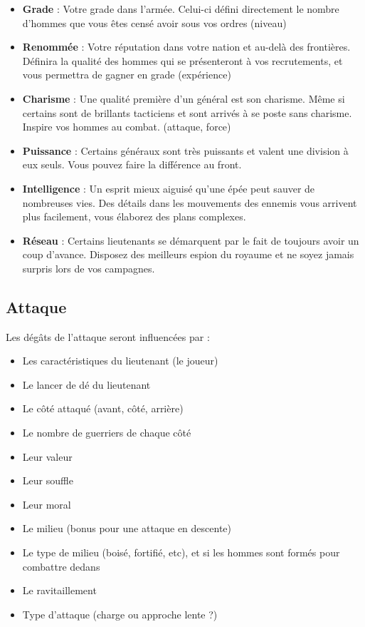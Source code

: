 \documentclass[french]{article}
\begin{document}
\begin{itemize}
	\item \textbf{Grade} : Votre grade dans l'armée. Celui-ci défini directement le nombre d'hommes que vous êtes censé avoir sous vos ordres (niveau)
	\item \textbf{Renommée} : Votre réputation dans votre nation et au-delà des frontières. Définira la qualité des hommes qui se présenteront à vos recrutements, et vous permettra de gagner en grade (expérience)
	\item \textbf{Charisme} : Une qualité première d'un général est son charisme. Même si certains sont de brillants tacticiens et sont arrivés à se poste sans charisme. Inspire vos hommes au combat. (attaque, force)
	\item \textbf{Puissance} : Certains généraux sont très puissants et valent une division à eux seuls. Vous pouvez faire la différence au front.
	\item \textbf{Intelligence} : Un esprit mieux aiguisé qu'une épée peut sauver de nombreuses vies. Des détails dans les mouvements des ennemis vous arrivent plus facilement, vous élaborez des plans complexes.
	\item \textbf{Réseau} : Certains lieutenants se démarquent par le fait de toujours avoir un coup d'avance. Disposez des meilleurs espion du royaume et ne soyez jamais surpris lors de vos campagnes.
\end{itemize}


\subsection{Attaque}

Les dégâts de l'attaque seront influencées par :
\begin{itemize}
	\item Les caractéristiques du lieutenant (le joueur)
	\item Le lancer de dé du lieutenant
	\item Le côté attaqué (avant, côté, arrière)
	\item Le nombre de guerriers de chaque côté
	\item Leur valeur
	\item Leur souffle
	\item Leur moral
	\item Le milieu (bonus pour une attaque en descente)
	\item Le type de milieu (boisé, fortifié, etc), et si les hommes sont formés pour combattre dedans
	\item Le ravitaillement
	\item Type d'attaque (charge ou approche lente ?)
\end{itemize}
\end{document}
